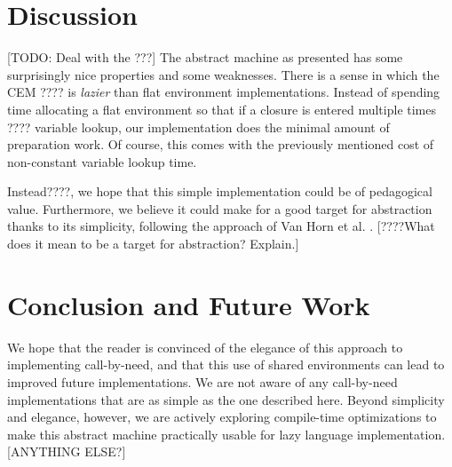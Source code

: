 \documentclass[preprint]{sigplanconf}
\begin{document}


\section{Discussion}
[TODO: Deal with the ???]
The abstract machine as presented has some surprisingly nice properties and some
weaknesses. There is a sense in which the CEM ???? is \emph{lazier} than flat
environment implementations. Instead of spending time allocating a flat
environment so that if a closure is entered multiple times ???? variable lookup, our
implementation does the minimal amount of preparation work. Of course, this
comes with the previously mentioned cost of non-constant variable lookup time. 

Instead????, we hope that this simple implementation could be of 
pedagogical value. Furthermore, we believe it could make for a good target
for abstraction thanks to its simplicity, following the approach of Van Horn et al.
\cite{van2010abstracting}. [????What does it mean to be a target for abstraction? Explain.]

\section{Conclusion and Future Work}
We hope that the reader is convinced of the elegance of this approach to implementing
call-by-need, and that this use of shared environments can lead to
improved future implementations. We are not aware of any call-by-need
implementations that are as simple as the one described here.
Beyond simplicity and elegance, however, 
we are actively exploring compile-time optimizations to make this abstract machine
practically usable for lazy language implementation. [ANYTHING ELSE?]



\end{document}
